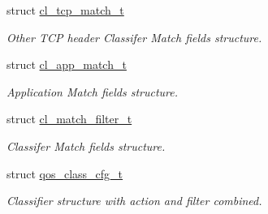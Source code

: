 \begin{DoxyCompactItemize}
struct \hyperlink{structcl__tcp__match__t}{cl\-\_\-tcp\-\_\-match\-\_\-t}
\begin{DoxyCompactList}\small\item\em Other T\-C\-P header Classifer Match fields structure. \end{DoxyCompactList}\item 
struct \hyperlink{structcl__app__match__t}{cl\-\_\-app\-\_\-match\-\_\-t}
\begin{DoxyCompactList}\small\item\em Application Match fields structure. \end{DoxyCompactList}\item 
struct \hyperlink{structcl__match__filter__t}{cl\-\_\-match\-\_\-filter\-\_\-t}
\begin{DoxyCompactList}\small\item\em Classifer Match fields structure. \end{DoxyCompactList}\item 
struct \hyperlink{structqos__class__cfg__t}{qos\-\_\-class\-\_\-cfg\-\_\-t}
\begin{DoxyCompactList}\small\item\em Classifier structure with action and filter combined. \end{DoxyCompactList}\end{DoxyCompactItemize}
